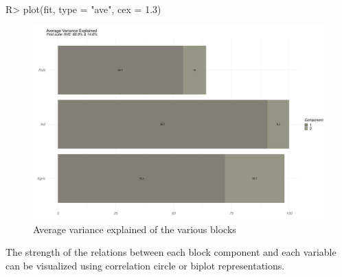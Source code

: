 \documentclass[
]{jss}
\begin{document}
\begin{CodeChunk}
\begin{CodeInput}
R> plot(fit, type = "ave", cex = 1.3)
\end{CodeInput}
\begin{figure}[H]

{\centering \includegraphics{RGCCA_21022023_files/figure-latex/unnamed-chunk-9-1} 

}

\caption[Average variance explained of the various blocks]{Average variance explained of the various blocks}\label{fig:unnamed-chunk-9}
\end{figure}
\end{CodeChunk}

\normalsize

The strength of the relations between each block component and each
variable can be visualized using correlation circle or biplot
representations.

\footnotesize
\end{document}
